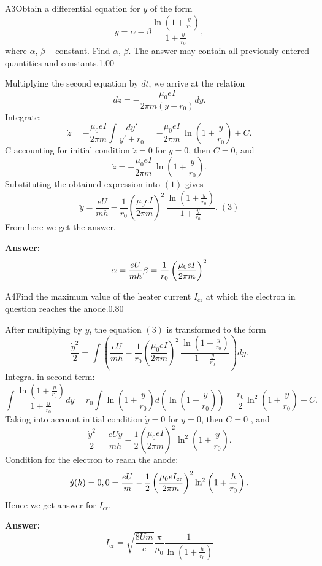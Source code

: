 \documentclass[11pt,a4paper]{article}
\begin{document}
\begin{solcard}{A3}{Obtain a differential equation for $y$ of the form $$\ddot{y} = \alpha - \beta \frac{\ln \left(1+\frac{y}{r_0}\right)}{1+\frac{y}{r_0}},$$ where $\alpha$, $\beta$ – constant. Find $\alpha$, $\beta$. The answer may contain all previously entered quantities and constants.}{1.00}

Multiplying the second equation by $dt$, we arrive at the relation $$d\dot{z} = -\dfrac{\mu_0 e I}{2 \pi m (y+r_0)}dy.$$Integrate: $$\dot{z} = -\dfrac{\mu_0 e I}{2 \pi m} \int \frac{dy'}{y'+r_0} = -\dfrac{\mu_0 e I}{2 \pi m} \, \ln\left(1+\frac{y}{r_0}\right)+C.$$C accounting for initial condition $\dot{z} = 0$ for $y = 0$, then $C = 0$, and $$\dot{z} = -\dfrac{\mu_0 e I}{2 \pi m} \, \ln\left(1+\frac{y}{r_0}\right).$$ Substituting the obtained expression into $(1)$ gives $$\ddot{y} = \dfrac{e U}{m h} - \frac{1}{r_0}\left( \dfrac{\mu_0 e I}{2\pi m}\right)^2 \, \dfrac{\ln\left(1+\frac{y}{r_0}\right)}{1+\frac{y}{r_0}}. \;(\text{3})$$From here we get the answer.

\par\smallskip\noindent\textbf{Answer:} $$\alpha = \frac{eU}{mh} \\ \ \\ \beta = \frac{1}{r_0}\left( \dfrac{\mu_0 e I}{2\pi m}\right)^2$$
\end{solcard}

\begin{solcard}{A4}{Find the maximum value of the heater current $I_\text{cr}$ at which the electron in question reaches the anode.}{0.80}

After multiplying by $\dot{y}$, the equation $(3)$ is transformed to the form $$\frac{\dot{y}^2}{2} = \int \left(\dfrac{e U}{m h} - \frac{1}{r_0}\left( \dfrac{\mu_0 e I}{2\pi m}\right)^2 \, \dfrac{\ln\left(1+\frac{y}{r_0}\right)}{1+\frac{y}{r_0}}\right) dy.$$ Integral in second term: $$\int \dfrac{\ln\left(1+\frac{y}{r_0}\right)}{1+\frac{y}{r_0}} dy = r_0 \int \ln\left(1+\frac{y}{r_0}\right)d\left(\ln\left(1+\frac{y}{r_0}\right)\right) = \frac{r_0}{2} \ln^2\left(1+\frac{y}{r_0}\right) + C.$$ Taking into account initial condition $\dot{y} = 0$ for $y = 0$, then $C = 0$ , and $$\frac{\dot{y}^2}{2} = \frac{eUy}{mh} - \frac{1}{2} \left( \dfrac{\mu_0 e I}{2\pi m}\right)^2 \ln^2\left(1+\frac{y}{r_0}\right).$$ Condition for the electron to reach the anode: $$\dot{y}(h) = 0, \\ 0 = \frac{eU}{m} - \frac{1}{2} \left(\dfrac{\mu_0 e I_\text{cr}}{2\pi m}\right)^2 \ln^2\left(1+\frac{h}{r_0}\right).$$Hence we get answer for $I_{cr}$.

\par\smallskip\noindent\textbf{Answer:} $$I_\text{cr} = \sqrt{\frac{8 U m}{e}} \frac{\pi}{\mu_0} \frac{1}{\ln\left(1+\frac{h}{r_0}\right)}$$
\end{solcard}
\end{document}
